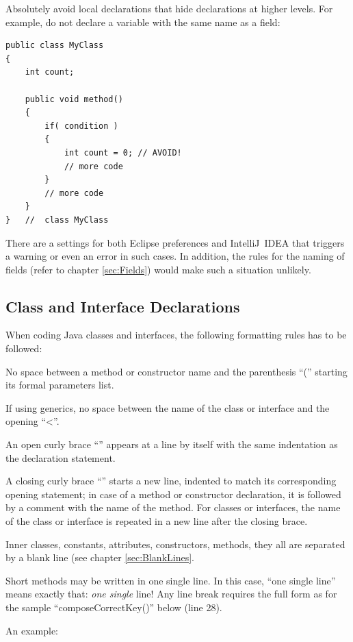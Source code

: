 \documentclass[12pt,a4paper,titlepage, parskip=half, headsepline, footsepline, cleardoubleplain]{scrbook}
\begin{document}
Absolutely avoid local declarations that hide declarations at higher levels. For example, do not declare a variable with the same name as a field:
\begin{lstlisting}
public class MyClass
{
    int count;

    public void method()
    {
        if( condition )
        {
            int count = 0; // AVOID!
            // more code
        }
        // more code
    }
}   //  class MyClass
\end{lstlisting}
There are a settings for both Eclipse preferences and IntelliJ~IDEA that triggers a warning or even an error in such cases. In addition, the rules for the naming of fields (refer to chapter \vref{sec:Fields}) would make such a situation unlikely.

\subsection{Class and Interface Declarations}
When coding Java classes and interfaces, the following formatting rules has to be followed:
\begin{itemize}
\item{No space between a method or constructor name and the parenthesis “(” starting its formal parameters list.}
\item{If using generics, no space between the name of the class or interface and the opening “<”.}
\item{An open curly brace “{” appears at a line by itself with the same indentation as the declaration statement.}
\item{A closing curly brace “}” starts a new line, indented to match its corresponding opening statement; in case of a method or constructor declaration, it is followed by a comment with the name of the method. For classes or interfaces, the name of the class or interface is repeated in a new line after the closing brace.}
\item{Inner classes, constants, attributes, constructors, methods, they all are separated by a blank line (see chapter \ref{sec:BlankLines}.}
\item{Short methods may be written in one single line. In this case, “one single line” means exactly that: \textit{one single} line! Any line break requires the full form as for the sample “composeCorrectKey()” below (line 28).}
\end{itemize}
An example:
\end{document}
